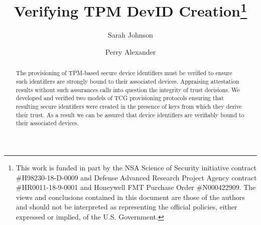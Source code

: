 \documentclass[runningheads]{llncs}
\begin{document}
%
\title{Verifying TPM DevID Creation\thanks{This work is funded in part
    by the NSA Science of Security initiative contract
    \#H98230-18-D-0009 and Defense Advanced Research Project Agency
    contract \#HR0011-18-9-0001 and Honeywell FMT Purchase Order
    \#N000422909. The views and conclusions contained in this document
    are those of the authors and should not be interpreted as
    representing the official policies, either expressed or implied,
    of the U.S. Government.}}
%
%
\author{Sarah Johnson \and
Perry Alexander}
%
%
%
\maketitle              %
%
\begin{abstract}
  The provisioning of TPM-based secure device identifiers must be
  verified to ensure such identifiers are strongly bound to their
  associated devices.  Appraising attestation results without such
  assurances calls into question the integrity of trust decisions.  We
  developed and verified two models of TCG provisioning protocols
  ensuring that resulting secure identifiers were created in the
  presence of keys from which they derive their trust.  As a result we
  can be assured that device identifiers are verifiably bound to their
  associated devices.

\end{abstract}
%
%
%
\end{document}
